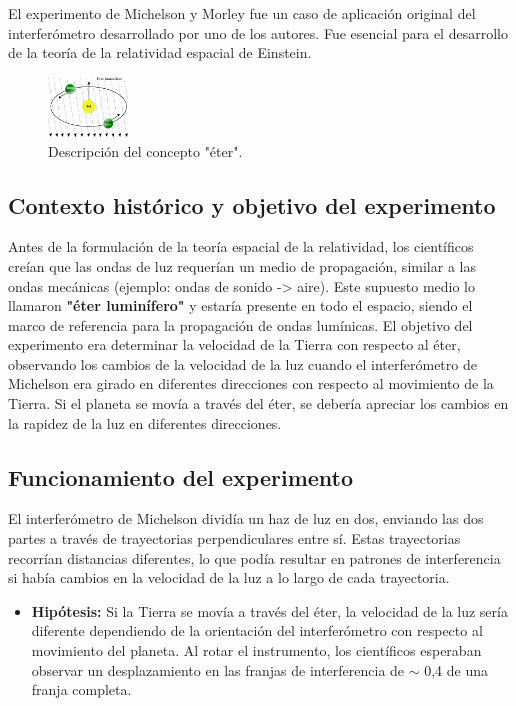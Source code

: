 \documentclass[a4paper]{article}
\begin{document}
		\indent El experimento de Michelson y Morley fue un caso de aplicación original del interferómetro desarrollado por uno de los autores. Fue esencial para el desarrollo de la teoría de la relatividad espacial de Einstein.
		
		\begin{figure}[h!]
			\centering
			\includegraphics[width=0.189216\textwidth]{../imagenes/experimentoMM.png}
			\caption{Descripción del concepto "éter".}
			\label{fig:experimentoMM}
		\end{figure}
		
		\subsection{Contexto histórico y objetivo del experimento}
		\indent Antes de la formulación de la teoría espacial de la relatividad, los científicos creían que las ondas de luz requerían un medio de propagación, similar a las ondas mecánicas (ejemplo: ondas de sonido -> aire). Este supuesto medio lo llamaron \textbf{"éter luminífero"} y estaría presente en todo el espacio, siendo el marco de referencia para la propagación de ondas lumínicas. \newline
		\indent El objetivo del experimento era determinar la velocidad de la Tierra con respecto al éter, observando los cambios de la velocidad de la luz cuando el interferómetro de Michelson era girado en diferentes direcciones con respecto al movimiento de la Tierra. Si el planeta se movía a través del éter, se debería apreciar los cambios en la rapidez de la luz en diferentes direcciones.
		
		\subsection{Funcionamiento del experimento}
		\indent El interferómetro de Michelson dividía un haz de luz en dos, enviando las dos partes a través de trayectorias perpendiculares entre sí. Estas trayectorias recorrían distancias diferentes, lo que podía resultar en patrones de interferencia si había cambios en la velocidad de la luz a lo largo de cada trayectoria.
		\begin{itemize}
			\item \textbf{Hipótesis:} Si la Tierra se movía a través del éter, la velocidad de la luz sería diferente dependiendo de la orientación del interferómetro con respecto al movimiento del planeta. Al rotar el instrumento, los científicos esperaban observar un desplazamiento en las franjas de interferencia de $\sim$ 0,4 de una franja completa.
		\end{itemize}
		
\end{document}

